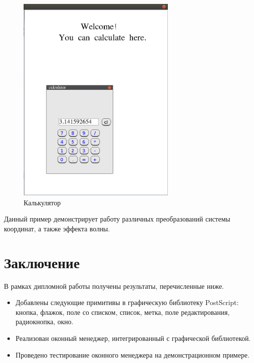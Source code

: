 \documentclass[14pt]{extarticle}
\begin{document}
	
	\begin{figure}[h]
		\begin{center}
		\begin{minipage}[h]{0.4\linewidth}
		\includegraphics[width=220pt]{pictures/filledCalc.png}
		\caption{ Калькулятор} %
		\label{ris:demo1} %
		\end{minipage}
		\end{center}
		\end{figure}
		
	Данный пример демонстрирует работу различных преобразований системы координат, а также эффекта волны.  
	
	\pagebreak
	\section*{Заключение}
	
	В рамках дипломной работы получены результаты, перечисленные ниже.
	\begin{itemize}
		\item Добавлены следующие примитивы в графическую библиотеку  PostScript: кнопка, флажок, поле со списком, список, метка, поле редактирования, радиокнопка, окно.
		\item Реализован оконный менеджер, интегрированный с графической библиотекой.
		\item Проведено тестирование оконного менеджера на демонстрационном примере.
	\end{itemize}
	
\end{document}
